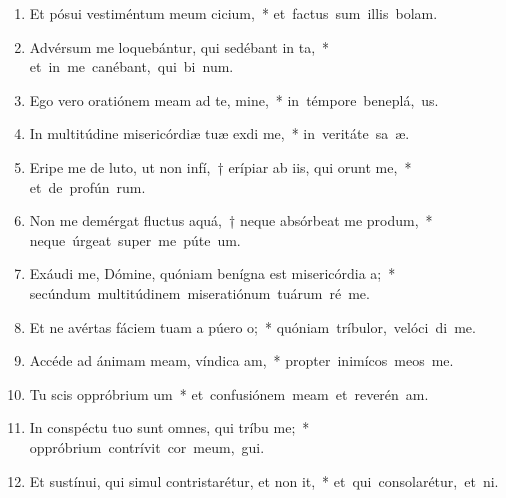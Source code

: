 \begin{flushleft}
\begin{enumerate}[leftmargin=*]
\item Et pósui vestiméntum meum cicium,~* \mbox{et factus sum illis  bolam.}

\item Advérsum me loquebántur, qui sedébant in ta,~* \mbox{et in me canébant, qui bi num.}

\item Ego vero oratiónem meam ad te, mine,~* \mbox{in témpore beneplá, us.}

\item In multitúdine misericórdiæ tuæ exdi me,~* \mbox{in veritáte sa æ.}

\item Eripe me de luto, ut non infí,~† erípiar ab iis, qui orunt me,~* \mbox{et de profún rum.}

\item Non me demérgat fluctus aquá,~† neque absórbeat me produm,~* \mbox{neque úrgeat super me púte  um.}

\item Exáudi me, Dómine, quóniam benígna est misericórdia a;~* \mbox{secúndum multitúdinem miseratiónum tuárum ré  me.}

\item Et ne avértas fáciem tuam a púero o;~* \mbox{quóniam tríbulor, velóci di me.}

\item Accéde ad ánimam meam, víndica am,~* \mbox{propter inimícos meos  me.}

\item Tu scis oppróbrium um~* \mbox{et confusiónem meam et reverén am.}

\item In conspéctu tuo sunt omnes, qui tríbu me;~* \mbox{oppróbrium contrívit cor meum,  gui.}

\item Et sustínui, qui simul contristarétur, et non it,~* \mbox{et qui consolarétur, et  ni.}


\end{enumerate}
\end{flushleft}
